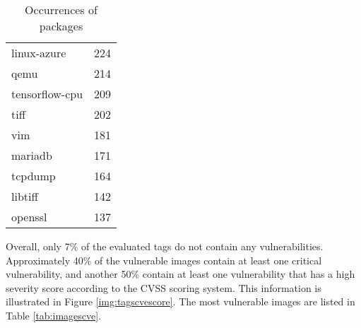 \begin{table}[htb]
{{\begin{tabular}{lr}
        linux-azure & 224 \\
        qemu & 214 \\
        tensorflow-cpu & 209 \\
        tiff & 202 \\
        vim & 181 \\
        mariadb & 171 \\
        tcpdump & 164 \\
        libtiff & 142 \\
        openssl & 137 \\ \bottomrule
    \end{tabular}
    }
    \hfill
    \caption{Occurrences of packages}
    \label{tab:packages}
}
\end{table}

Overall, only 7\% of the evaluated tags do not contain any vulnerabilities. Approximately 40\% of the vulnerable images contain at least one critical vulnerability, and another 50\% contain at least one vulnerability that has a high severity score according to the CVSS scoring system. This information is illustrated in Figure \ref{img:tagscvescore}. The most vulnerable images are listed in Table \ref{tab:imagescve}.

